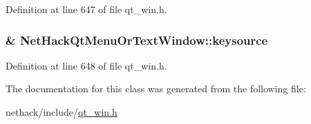 Definition at line 647 of file qt\+\_\+win.\+h.

\hypertarget{classNetHackQtMenuOrTextWindow_a433fa3ee929fefa9f56638053eb8c83d}{
\subsubsection[{keysource}]{\& Net\+Hack\+Qt\+Menu\+Or\+Text\+Window\+::keysource\hspace{0.3cm}{\ttfamily [private]}}}\label{classNetHackQtMenuOrTextWindow_a433fa3ee929fefa9f56638053eb8c83d}


Definition at line 648 of file qt\+\_\+win.\+h.



The documentation for this class was generated from the following file\+:\begin{DoxyCompactItemize}
\item 
nethack/include/\hyperlink{qt__win_8h}{qt\+\_\+win.\+h}\end{DoxyCompactItemize}

